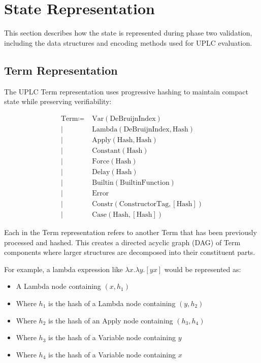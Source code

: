 \documentclass[../midgard.tex]{subfiles}
\begin{document}
\section{State Representation}
\label{s:phase-two-state-representation}

This section describes how the state is represented during phase two validation, including the data structures and encoding methods used for UPLC evaluation.

\subsection{Term Representation}

The UPLC Term representation uses progressive hashing to maintain compact state while preserving verifiability:

\begin{align*}
    \text{Term} \coloneq&\;
        \text{Var} (\text{DeBruijnIndex}) \\\mid&\;
        \text{Lambda} (\text{DeBruijnIndex}, \text{Hash}) \\\mid&\;
        \text{Apply} (\text{Hash}, \text{Hash}) \\\mid&\;
        \text{Constant} (\text{Hash}) \\\mid&\;
        \text{Force} (\text{Hash}) \\\mid&\;
        \text{Delay} (\text{Hash}) \\\mid&\;
        \text{Builtin} (\text{BuiltinFunction}) \\\mid&\;
        \text{Error} \\\mid&\;
        \text{Constr}(\text{ConstructorTag}, [\text{Hash}]) \\\mid&\;
        \text{Case}(\text{Hash}, [\text{Hash}])
\end{align*}

Each  in the Term representation refers to another Term that has been previously processed and hashed. This creates a directed acyclic graph (DAG) of Term components where larger structures are decomposed into their constituent parts.

For example, a lambda expression like \(\lambda x.\lambda y.[y x]\) would be represented as:
\begin{itemize}
    \item A Lambda node containing \((x, h_1)\)
    \item Where \(h_1\) is the hash of a Lambda node containing \((y, h_2)\)
    \item Where \(h_2\) is the hash of an Apply node containing \((h_3, h_4)\)
    \item Where \(h_3\) is the hash of a Variable node containing \(y\)
    \item Where \(h_4\) is the hash of a Variable node containing \(x\)
\end{itemize}
\end{document}
